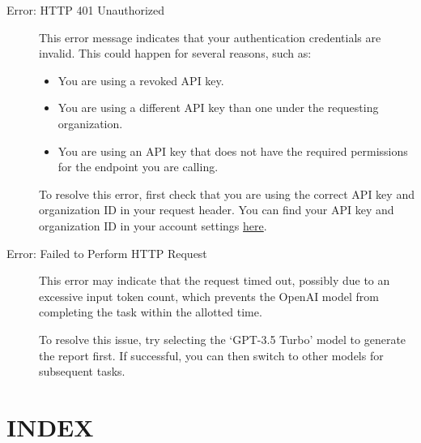 \documentclass[
]{book}
\begin{document}
\begin{description}
\item[Error: HTTP 401 Unauthorized]
This error message indicates that your authentication credentials are invalid. This could happen for several reasons, such as:

\begin{itemize}
\item
  You are using a revoked API key.
\item
  You are using a different API key than one under the requesting organization.
\item
  You are using an API key that does not have the required permissions for the endpoint you are calling.
\end{itemize}

To resolve this error, first check that you are using the correct API key and organization ID in your request header. You can find your API key and organization ID in your account settings \href{https://platform.openai.com/account/api-keys}{here}.
\item[Error: Failed to Perform HTTP Request]
This error may indicate that the request timed out, possibly due to an excessive input token count, which prevents the OpenAI model from completing the task within the allotted time.

To resolve this issue, try selecting the `GPT-3.5 Turbo' model to generate the report first. If successful, you can then switch to other models for subsequent tasks.
\end{description}

\chapter{INDEX}\label{sec-index}
\end{document}
